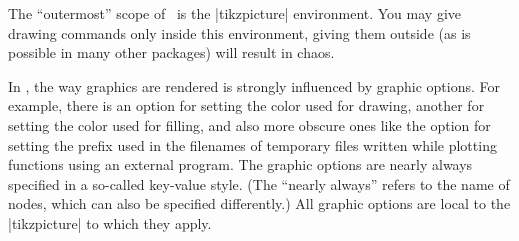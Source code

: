 The ``outermost'' scope of \tikzname\ is the |{tikzpicture}| 
environment. You may give drawing commands only inside this
environment, giving them outside (as is possible in many other
packages) will result in chaos.

In \tikzname, the way graphics are rendered is strongly influenced by
graphic options. For example, there is an option for setting the color used
for drawing, another for setting the color used for filling, and also
more obscure ones like the option  for setting the prefix used in the
filenames of temporary files written while plotting functions using an
external program. The graphic options are nearly always specified in a
so-called key-value style. (The ``nearly always'' refers to the name
of nodes, which can also be specified differently.) All graphic
options are local to the |{tikzpicture}| to which they apply.

